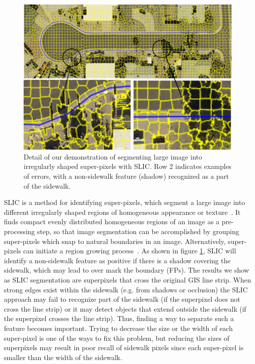 \begin{figure}[H]
\centering
\includegraphics[width=\textwidth]{Figures/slic_sample1.pdf}
\caption[Example of Simple Linear Iterative Clustering]{
Detail of our demonstration of segmenting large image into irregularly shaped super-pixels with \ac{SLIC}.
Row 2 indicates examples of errors, with a non-sidewalk feature (shadow) recognized as a part of the sidewalk.}
\label{fig:slic}
\end{figure}

\acf{SLIC} is a method for identifying super-pixels, which segment a large image into different
irregularly shaped regions of homogeneous appearance or texture~\cite{Achanta:149300}. It finds
compact evenly distributed homogeneous regions of an image as a pre-processing step, so that image
segmentation can be accomplished by grouping super-pixels which snap to natural boundaries in an
image. Alternatively, super-pixels can initiate a region growing process~\cite{Borovec2017-fz}. As
shown in figure \ref{fig:slic}, \ac{SLIC} will identify a non-sidewalk feature as positive if there
is a shadow covering the sidewalk, which may lead to over mark the boundary (\acp{FP}). 
The results we show as \ac{SLIC} segmentation are superpixels that cross the original \ac{GIS} line strip.
When strong edges exist within the sidewalk (e.g. from shadows or occlusion) the \ac{SLIC} approach may
 fail to recognize part of the sidewalk (if the superpixel does not cross the line strip) or it may 
 detect objects that extend outside the sidewalk (if the superpixel crosses the line strip). 
Thus, finding a way to separate such a feature becomes
important. Trying to decrease the size or the width of each super-pixel is one of the ways to fix
this problem, but reducing the sizes of superpixels may result in poor recall of sidewalk pixels 
since each super-pixel is smaller than the width of the sidewalk.


